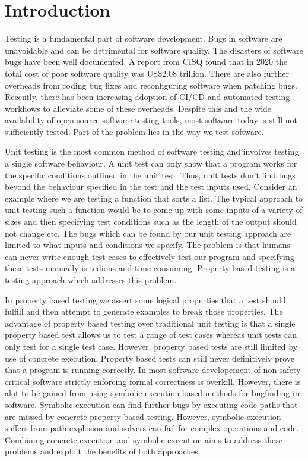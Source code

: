\chapter{Introduction}
\label{cha:intro}
Testing is a fundamental part of software development. Bugs in software are unavoidable and can be detrimental for software quality. The disasters of software bugs have been well documented. A report from CISQ found that in 2020 the total cost of poor software quality was US\$2.08 trillion. There are also further overheads from coding bug fixes and reconfiguring software when patching bugs. Recently, there has been increasing adoption of CI/CD and automated testing workflows to alleviate some of these overheads. Despite this and the wide availability of open-source software testing tools, most software today is still not sufficiently tested. Part of the problem lies in the way we test software. 

Unit testing is the most common method of software testing and involves testing a single software behaviour. A unit test can only show that a program works for the specific conditions outlined in the unit test. Thus, unit tests don’t find bugs beyond the behaviour specified in the test and the test inputs used. Consider an example where we are testing a function that sorts a list. The typical approach to unit testing such a function would be to come up with some inputs of a variety of sizes and then specifying test conditions such as the length of the output should not change etc. The bugs which can be found by our unit testing approach are limited to what inputs and conditions we specify. The problem is that humans can never write enough test cases to effectively test our program and specifying these tests manually is tedious and time-consuming. Property based testing is a testing approach which addresses this problem.

In property based testing we assert some logical properties that a test should fulfill and then attempt to generate examples to break those properties. The advantage of property based testing over traditional unit testing is that a single property based test allows us to test a range of test cases whereas unit tests can only test for a single test case. However, property based tests are still limited by use of concrete execution. Property based tests can still never definitively prove that a program is running correctly. In most software developement of non-safety critical software strictly enforcing formal correctness is overkill. However, there is alot to be gained from using symbolic execution based methods for bugfinding in software. Symbolic execution can find further bugs by executing code paths that are missed by concrete property based testing. However, symbolic execution suffers from path explosion and solvers can fail for complex operations and code. Combining concrete execution and symbolic execution aims to address these problems and exploit the benefits of both approaches.

